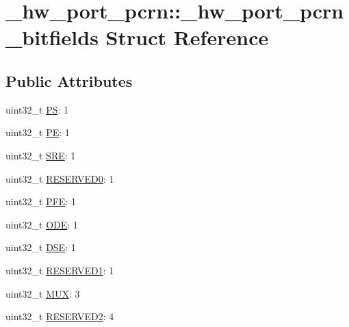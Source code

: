 \hypertarget{struct__hw__port__pcrn_1_1__hw__port__pcrn__bitfields}{}\section{\+\_\+hw\+\_\+port\+\_\+pcrn\+:\+:\+\_\+hw\+\_\+port\+\_\+pcrn\+\_\+bitfields Struct Reference}
\label{struct__hw__port__pcrn_1_1__hw__port__pcrn__bitfields}
\subsection*{Public Attributes}
\begin{DoxyCompactItemize}
\item 
uint32\+\_\+t \hyperlink{struct__hw__port__pcrn_1_1__hw__port__pcrn__bitfields_a784c9197fb863e22005caf10eb5b8ae9}{PS}\+: 1
\item 
uint32\+\_\+t \hyperlink{struct__hw__port__pcrn_1_1__hw__port__pcrn__bitfields_acd0f38d132b2bb283bbe9398953f9de8}{PE}\+: 1
\item 
uint32\+\_\+t \hyperlink{struct__hw__port__pcrn_1_1__hw__port__pcrn__bitfields_a6c28e0f766aa718d138b21ed849749c7}{S\+RE}\+: 1
\item 
uint32\+\_\+t \hyperlink{struct__hw__port__pcrn_1_1__hw__port__pcrn__bitfields_a1a44525d8cba1d7796cd8867304fe5e8}{R\+E\+S\+E\+R\+V\+E\+D0}\+: 1
\item 
uint32\+\_\+t \hyperlink{struct__hw__port__pcrn_1_1__hw__port__pcrn__bitfields_a1eeac125d8abd0b434eb05da5846c0c7}{P\+FE}\+: 1
\item 
uint32\+\_\+t \hyperlink{struct__hw__port__pcrn_1_1__hw__port__pcrn__bitfields_a218e9d9f81234befe22c1f7b61af33a6}{O\+DE}\+: 1
\item 
uint32\+\_\+t \hyperlink{struct__hw__port__pcrn_1_1__hw__port__pcrn__bitfields_a51ea92d66de56d050ca7cc2f53d0d71e}{D\+SE}\+: 1
\item 
uint32\+\_\+t \hyperlink{struct__hw__port__pcrn_1_1__hw__port__pcrn__bitfields_a20634dc73b98658156f77f241f8bbc68}{R\+E\+S\+E\+R\+V\+E\+D1}\+: 1
\item 
uint32\+\_\+t \hyperlink{struct__hw__port__pcrn_1_1__hw__port__pcrn__bitfields_a20d23a1c46fdfdaa50c20f194538e061}{M\+UX}\+: 3
\item 
uint32\+\_\+t \hyperlink{struct__hw__port__pcrn_1_1__hw__port__pcrn__bitfields_a3aac5ea853fccda3dbb7c0beb4822f51}{R\+E\+S\+E\+R\+V\+E\+D2}\+: 4
\item 

\end{DoxyCompactItemize}
